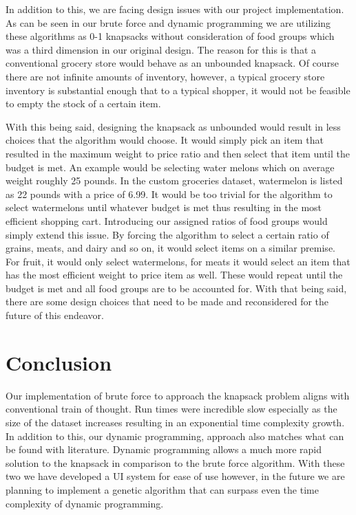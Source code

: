 \documentclass[10pt,journal,compsoc]{IEEEtran}
\begin{document}
In addition to this, we are facing design issues with our project
implementation. As can be seen in our brute force and dynamic programming we are
utilizing these algorithms as 0-1 knapsacks without consideration of food groups
which was a third dimension in our original design. The reason for this is that
a conventional grocery store would behave as an unbounded knapsack. Of course
there are not infinite amounts of inventory, however, a typical grocery store
inventory is substantial enough that to a typical shopper, it would not be
feasible to empty the stock of a certain item.

With this being said, designing the knapsack as unbounded would result in less
choices that the algorithm would choose. It would simply pick an item that
resulted in the maximum weight to price ratio and then select that item until
the budget is met. An example would be selecting water melons which on average
weight roughly 25 pounds. In the custom groceries dataset, watermelon is listed
as 22 pounds with a price of 6.99. It would be too trivial for the algorithm to
select watermelons until whatever budget is met thus resulting in the most
efficient shopping cart. Introducing our assigned ratios of food groups would
simply extend this issue. By forcing the algorithm to select a certain ratio of
grains, meats, and dairy and so on, it would select items on a similar premise.
For fruit, it would only select watermelons, for meats it would select an item
that has the most efficient weight to price item as well. These would repeat
until the budget is met and all food groups are to be accounted for. With that
being said, there are some design choices that need to be made and reconsidered
for the future of this endeavor.

\section{Conclusion}
Our implementation of brute force to approach the knapsack problem aligns with
conventional train of thought. Run times were incredible slow especially as the
size of the dataset increases resulting in an exponential time complexity
growth. In addition to this, our dynamic programming, approach also matches what
can be found with literature. Dynamic programming allows a much more rapid
solution to the knapsack in comparison to the brute force algorithm. With these
two we have developed a UI system for ease of use however, in the future we are
planning to implement a genetic algorithm that can surpass even the time
complexity of dynamic programming.
\end{document}
